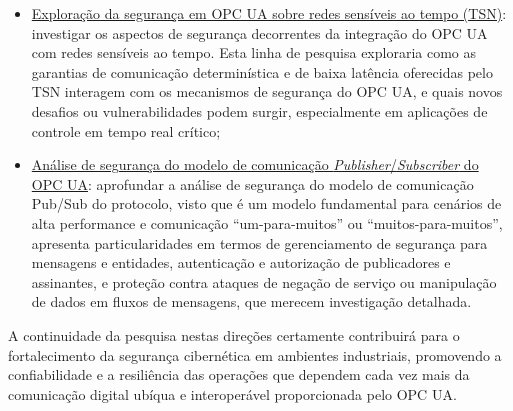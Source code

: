 \begin{itemize}
        \item \underline{Exploração da segurança em OPC UA sobre redes sensíveis ao tempo (TSN)}: investigar os aspectos de segurança decorrentes da integração do OPC UA com redes sensíveis ao tempo. Esta linha de pesquisa exploraria como as garantias de comunicação determinística e de baixa latência oferecidas pelo TSN interagem com os mecanismos de segurança do OPC UA, e quais novos desafios ou vulnerabilidades podem surgir, especialmente em aplicações de controle em tempo real crítico;
        \item \underline{Análise de segurança do modelo de comunicação \textit{Publisher}/\textit{Subscriber} do OPC UA}: aprofundar a análise de segurança do modelo de comunicação Pub/Sub do protocolo, visto que é um modelo fundamental para cenários de alta performance e comunicação ``um-para-muitos'' ou ``muitos-para-muitos'', apresenta particularidades em termos de gerenciamento de segurança para mensagens e entidades, autenticação e autorização de publicadores e assinantes, e proteção contra ataques de negação de serviço ou manipulação de dados em fluxos de mensagens, que merecem investigação detalhada.
    \end{itemize}

    A continuidade da pesquisa nestas direções certamente contribuirá para o fortalecimento da segurança cibernética em ambientes industriais, promovendo a confiabilidade e a resiliência das operações que dependem cada vez mais da comunicação digital ubíqua e interoperável proporcionada pelo OPC UA.
